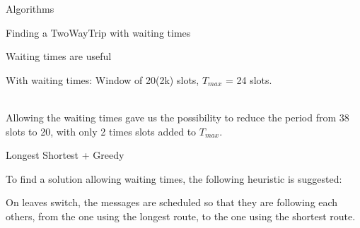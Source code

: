 \documentclass[a4paper,10pt]{report}
\begin{document}
\begin{chapter}{Algorithms}
\begin{section}{Finding a TwoWayTrip with waiting times}
\begin{subsection}{Waiting times are useful}
{{{
  }
  
    With waiting times: Window of 20(2k) slots, $T_{max}$ = 24 slots.

  }}\\
  
  Allowing the waiting times gave us the possibility to reduce the period from 38 slots to 20, with only 2 times slots added to $T_{max}$.
\end{subsection}
\begin{subsection}{Longest Shortest + Greedy}
 

To find a solution allowing waiting times, the following heuristic is suggested:

On leaves switch, the messages are scheduled so that they are following each others, from the one using the longest route, to the one using the shortest route.


\end{subsection}
\end{section}
\end{chapter}
\end{document}
